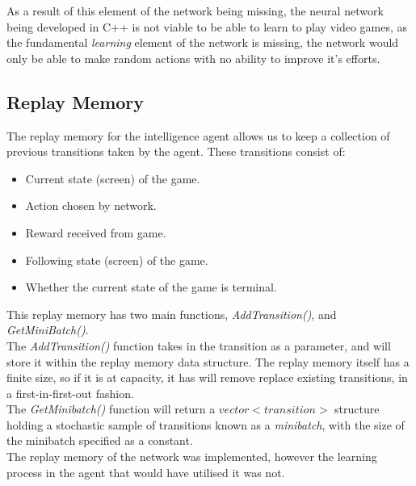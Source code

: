 \documentclass[10pt]{article}
\begin{document}
		
		As a result of this element of the network being missing, the neural network being developed in C++ is not viable to be able to learn to play video games, as the fundamental \textit{learning} element of the network is missing, the network would only be able to make random actions with no ability to improve it's efforts.
	\medskip
	
	\subsection{Replay Memory}
		The replay memory for the intelligence agent allows us to keep a collection of previous transitions taken by the agent. These transitions consist of:
		\begin{itemize}
			\item Current state (screen) of the game.
			\item Action chosen by network.
			\item Reward received from game.
			\item Following state (screen) of the game.
			\item Whether the current state of the game is terminal.
		\end{itemize}
		
		This replay memory has two main functions, \textit{AddTransition()}, and \textit{GetMiniBatch()}.\\
		
		The \textit{AddTransition()} function takes in the transition as a parameter, and will store it within the replay memory data structure. The replay memory itself has a finite size, so if it is at capacity, it has will remove replace existing transitions, in a first-in-first-out fashion.\\
		
		The \textit{GetMinibatch()} function will return a $vector<transition>$ structure holding a stochastic sample of transitions known as a \textit{minibatch}, with the size of the minibatch specified as a constant.\\
		
		The replay memory of the network was implemented, however the learning process in the agent that would have utilised it was not.
	\medskip	
	
\end{document}
